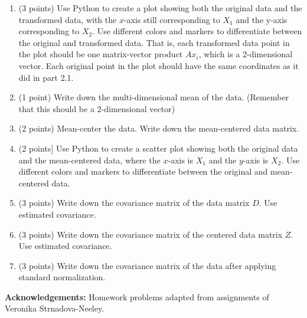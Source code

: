 \documentclass[11pt]{article}
\begin{document}
\begin{enumerate}
\begin{enumerate}
        \item (3 points) Use Python to create a plot showing both the original
        data and the transformed data, with the $x$-axis still corresponding to
        $X_1$ and the y-axis corresponding to $X_2$. Use different colors and
        markers to differentiate between the original and transformed data. That
        is, each transformed data point in the plot should be one matrix-vector
        product $Ax_i$, which is a 2-dimensional vector. Each original point in
        the plot should have the same coordinates as it did in part 2.1.

        \item (1 point) Write down the multi-dimensional mean of the data.
        (Remember that this should be a 2-dimensional vector)

        \item (2 points) Mean-center the data. Write down the mean-centered data
        matrix.

        \item (2 points] Use Python to create a scatter plot showing both the
        original data and the mean-centered data, where the $x$-axis is $X_1$
        and the $y$-axis is $X_2$. Use different colors and markers to
        differentiate between the original and mean-centered data.

        \item (3 points) Write down the covariance matrix of the data matrix
        $D$. Use estimated covariance.

        \item (3 points) Write down the covariance matrix of the centered data
        matrix $Z$. Use estimated covariance.

        \item (3 points) Write down the covariance matrix of the data after
        applying standard normalization.

    \end{enumerate}

\end{enumerate}

{\bf Acknowledgements:} Homework problems adapted from assignments of
Veronika Strnadova-Neeley.
\end{document}
